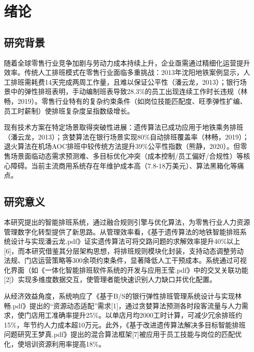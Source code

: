 \documentclass{ctexart}
\begin{document}
\tableofcontents
\clearpage

\setcounter{page}{1} %
\pagestyle{plain} %

\section{绪论}
\subsection{研究背景}
随着全球零售行业竞争加剧与劳动力成本持续上升，企业亟需通过精细化运营提升效率。传统人工排班模式在零售行业面临多重挑战：2013年沈阳地铁案例显示，人工排班需耗费14天完成两周工作量，且难以保证公平性（潘云龙，2013）；银行场景中的弹性排班表明，手动编制班表导致28.3\%的员工出现连续工作时长违规（林畅，2019）。零售行业特有的复杂约束条件（如岗位技能匹配度、旺季弹性扩编、员工时薪制）使排班复杂度呈指数级增长。

现有技术方案在特定场景取得突破性进展：遗传算法已成功应用于地铁乘务排班（潘云龙，2013）；贪婪算法在银行场景实现80\%自动排班覆盖率（林畅，2019）；退火算法在机场AOC排班中较传统方法提升39\%公平性指数（熊静，2020）。但零售场景面临动态需求预测难、多目标优化冲突（成本控制/员工偏好/合规性）等核心障碍。当前主流商用系统存在年维护成本高（7.8-18万美元）、算法黑箱化等痛点。

\subsection{研究意义}
本研究提出的智能排班系统，通过融合规则引擎与优化算法，为零售行业人力资源管理数字化转型提供了新思路。从管理效率看，《基于遗传算法的地铁智能排班系统设计与实现潘云龙.pdf》证实遗传算法可将交路问题的求解效率提升40\%以上[6]，而本研究借鉴其分层架构思想，将排班规则模块化封装，支持动态调整劳动法规、门店运营策略等300余项约束条件，显著降低人工干预成本。系统通过可视化界面（如《一体化智能排班软件系统的开发与应用王莹.pdf》中的交叉关联功能[2]）实现多维度数据交互，使管理者能快速识别人力缺口并优化配置。

从经济效益角度，系统响应了《基于B/S的银行弹性排班管理系统设计与实现林畅.pdf》提出的“资源动态适配”需求[1]，通过贪婪算法预测各时段客流量与人力需求，使门店用工准确率提升25\%。以单店月均2000工时计算，可减少冗余排班约15\%，年节约人力成本超10万元。此外，《基于改进遗传算法解决多目标智能排班问题研究王梦真.pdf》提出的混合算法框架[7]被应用于员工技能与岗位的匹配优化，使培训资源利用率提高18\%。
\end{document}
